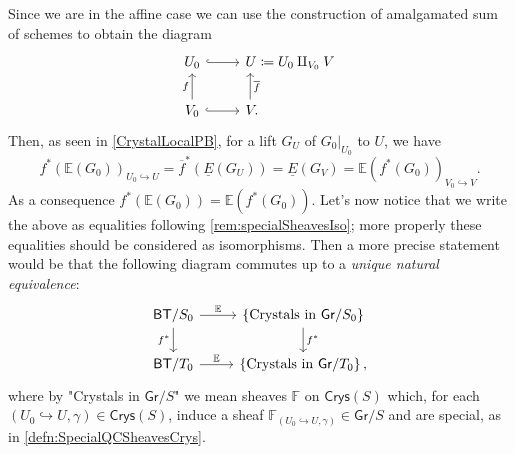 \begin{rem}\label{PBCrystals}
	Since we are in the affine case we can use the construction of amalgamated
	sum of schemes to obtain the diagram
	\begin{equation*}
	\begin{tikzcd}[/tikz/column 2/.append style={anchor=base west}]
		U_0 \arrow[r, "", hookrightarrow] &
		U \coloneqq U_0 \amalg_{V_0} V \\
		V_0 \arrow[u, "f", rightarrow] 
		\arrow[r, "", hookrightarrow] &
		V \arrow[u, "\overline{f}"', rightarrow, end anchor={[xshift=1.84ex,yshift=0.29ex]south west},
		start anchor={[xshift=0.38ex]}] 
	.\end{tikzcd}
	\end{equation*}
	Then, as seen in \cref{CrystalLocalPB}, for a lift $G_U$ 
	of $\left.G_0\right|_{U_0}$ to $U$, we have
	\begin{equation*}
		f^* \left( \mathbb{E}(G_0) \right)_{ U_0 \hookrightarrow U } =
		\overline{f}^* \left( \underline{E}(G_U) \right) =
		\underline{E}(G_V) = \mathbb{E} \left( f^* (G_0) \right)_{V_0 \hookrightarrow V}
	.\end{equation*}
	As a consequence $f^* \left( \mathbb{E}(G_0) \right) =
	\mathbb{E}\left( f^*(G_0) \right)$.
	Let's now notice that we write the above as equalities following \cref{rem:specialSheavesIso};
	more properly these equalities should be considered as isomorphisms.
	Then a more precise statement would be that the following diagram
	commutes up to a \emph{unique natural equivalence}:
	\begin{equation*}
	\begin{tikzcd}
		\mathsf{BT}/S_0
		\arrow[r, "\mathbb{E}", rightarrow] 
		\arrow[d, "f^*"', rightarrow] &
		\left\{ \text{Crystals in } \mathsf{Gr}/S_0 \right\}
		\arrow[d, "f^*", rightarrow] \\
		\mathsf{BT}/T_0 \arrow[r, "\mathbb{E}", rightarrow] &
		\left\{ \text{Crystals in } \mathsf{Gr}/T_0 \right\}
	,\end{tikzcd}
	\end{equation*}
	where by "Crystals in $\mathsf{Gr}/S$" we mean sheaves $\mathbb{F}$ on $\mathsf{Crys}(S)$
	which, for each $\left(U_0 \hookrightarrow U, \gamma\right) \in \mathsf{Crys}(S)$,
	induce a sheaf $\mathbb{F}_{\left(U_0 \hookrightarrow U, \gamma\right)} \in \mathsf{Gr}/S$
	and are special, as in \cref{defn:SpecialQCSheavesCrys}.
\end{rem}


